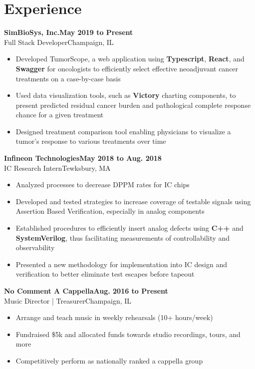 \documentclass[9pt]{extarticle}
\newcommand{\experiencesubsection}[4]{
    \vspace{0.75em}\Large\textbf{#1\hfill{#4}}\\{#2}\hfill{#3}\normalsize
}
\begin{document}
\hfill\begin{minipage}[t]{.7\textwidth}  %
    \section{Experience}
    \experiencesubsection{SimBioSys, Inc.}{Full Stack Developer}{Champaign, IL}{May 2019 to Present}
    \begin{itemize}
        \setlength\itemsep{1dd}
        \item Developed TumorScope, a web application using \textbf{Typescript}, \textbf{React}, and \textbf{Swagger} for oncologists to efficiently select effective neoadjuvant cancer treatments on a case-by-case basis
        \item Used data visualization tools, such as \textbf{Victory} charting components, to present predicted residual cancer burden and pathological complete response chance for a given treatment
        \item Designed treatment comparison tool enabling physicians to visualize a tumor's response to various treatments over time
    \end{itemize}

    \experiencesubsection{Infineon Technologies}{IC Research Intern}{Tewksbury, MA}{May 2018 to Aug. 2018}
    \begin{itemize}
        \setlength\itemsep{1dd}
        \item Analyzed processes to decrease DPPM rates for IC chips
        \item Developed and tested strategies to increase coverage of testable signals using Assertion Based Verification, especially in analog components
        \item Established procedures to efficiently insert analog defects using \textbf{C++} and \textbf{SystemVerilog}, thus facilitating measurements of controllability and observability 
        \item Presented a new methodology for implementation into IC design and verification to better eliminate test escapes before tapeout
    \end{itemize}

    \experiencesubsection{No Comment A Cappella}{Music Director | Treasurer}{Champaign, IL}{Aug. 2016 to Present}
    \begin{itemize}
        \setlength\itemsep{1dd}
        \item Arrange and teach music in weekly rehearsals (10+ hours/week)
        \item Fundraised \$5k and allocated funds towards studio recordings, tours, and more
        \item Competitively perform as nationally ranked a cappella group
    \end{itemize}


\end{minipage}
\end{document}
